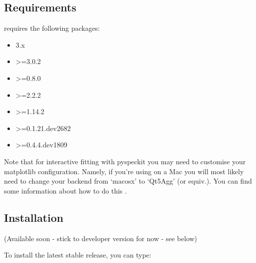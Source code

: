 \documentclass[letterpaper,10pt,english]{sphinxmanual}
\begin{document}
\subsection{Requirements}
\label{\detokenize{installation:requirements}}
 requires the following packages:
\begin{itemize}
\item {} 
 3.x

\item {} 
 \textgreater{}=3.0.2

\item {} 
 \textgreater{}=0.8.0

\item {} 
 \textgreater{}=2.2.2

\item {} 
 \textgreater{}=1.14.2

\item {} 
 \textgreater{}=0.1.21.dev2682

\item {} 
 \textgreater{}=0.4.4.dev1809

\end{itemize}

Note that for interactive fitting with pyspeckit you may need to customise your
matplotlib configuration. Namely, if you’re using  on a Mac you will
most likely need to change your backend from ‘macosx’ to ‘Qt5Agg’ (or equiv.).
You can find some information about how to do this .


\subsection{Installation}
\label{\detokenize{installation:installation}}
(Available soon - stick to developer version for now - see below)

To install the latest stable release, you can type:

\begin{sphinxVerbatim}[commandchars=\\\{\}]
  
\end{sphinxVerbatim}
\end{document}

